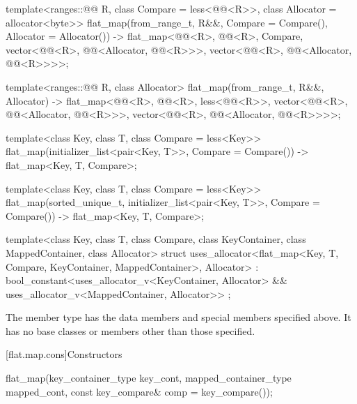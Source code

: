 \begin{codeblock}
{  template<ranges::@@ R, class Compare = less<@@<R>>,
           class Allocator = allocator<byte>>
    flat_map(from_range_t, R&&, Compare = Compare(), Allocator = Allocator())
      -> flat_map<@@<R>, @@<R>, Compare,
                  vector<@@<R>, @@<Allocator, @@<R>>>,
                  vector<@@<R>, @@<Allocator, @@<R>>>>;

  template<ranges::@@ R, class Allocator>
    flat_map(from_range_t, R&&, Allocator)
      -> flat_map<@@<R>, @@<R>, less<@@<R>>,
                  vector<@@<R>, @@<Allocator, @@<R>>>,
                  vector<@@<R>, @@<Allocator, @@<R>>>>;

  template<class Key, class T, class Compare = less<Key>>
    flat_map(initializer_list<pair<Key, T>>, Compare = Compare())
      -> flat_map<Key, T, Compare>;

  template<class Key, class T, class Compare = less<Key>>
    flat_map(sorted_unique_t, initializer_list<pair<Key, T>>, Compare = Compare())
        -> flat_map<Key, T, Compare>;

  template<class Key, class T, class Compare, class KeyContainer, class MappedContainer,
            class Allocator>
    struct uses_allocator<flat_map<Key, T, Compare, KeyContainer, MappedContainer>, Allocator>
      : bool_constant<uses_allocator_v<KeyContainer, Allocator> &&
                      uses_allocator_v<MappedContainer, Allocator>> { };
}
\end{codeblock}

\pnum
The member type  has the data members and special members
specified above.
It has no base classes or members other than those specified.

[flat.map.cons]{Constructors}

%
\begin{itemdecl}
flat_map(key_container_type key_cont, mapped_container_type mapped_cont,
         const key_compare& comp = key_compare());
\end{itemdecl}


